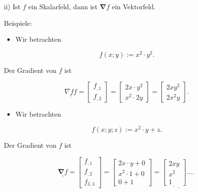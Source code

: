\documentclass[10pt]{article}
\begin{document}
ii) Ist $f$ ein Skalarfeld, dann ist $\boldsymbol{\nabla} f$ ein Vektorfeld.

Beispiele:

\begin{itemize}
  \item Wir betrachten
\end{itemize}


\begin{equation*}
f(x ; y):=x^{2} \cdot y^{2} . \tag{2.138}
\end{equation*}


Der Gradient von $f$ ist

\[
\underline{\underline{\nabla f f}}=\left[\begin{array}{l}
f_{, 1}  \tag{2.139}\\
f_{, 2}
\end{array}\right]=\left[\begin{array}{l}
2 x \cdot y^{2} \\
x^{2} \cdot 2 y
\end{array}\right]=\left[\begin{array}{l}
2 x y^{2} \\
2 x^{2} y
\end{array}\right] .
\]

\begin{itemize}
  \item Wir betrachten
\end{itemize}


\begin{equation*}
f(x ; y ; z):=x^{2} \cdot y+z . \tag{2.140}
\end{equation*}


Der Gradient von $f$ ist

\[
\underline{\underline{\boldsymbol{\nabla} f}}=\left[\begin{array}{l}
f_{, 1}  \tag{2.141}\\
f_{, 2} \\
f_{3,3}
\end{array}\right]=\left[\begin{array}{c}
2 x \cdot y+0 \\
x^{2} \cdot 1+0 \\
0+1
\end{array}\right]=\underline{\underline{\left[\begin{array}{c}
2 x y \\
x^{2} \\
1
\end{array}\right]} . . . . ~}
\]
\end{document}
